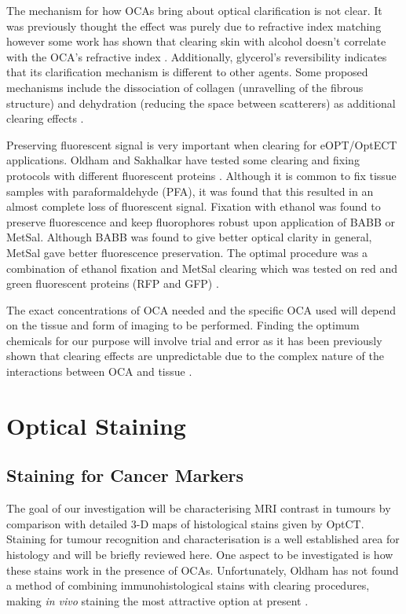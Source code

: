 \documentclass[12pt]{article}
\begin{document}
The mechanism for how OCAs bring about optical clarification is not clear. It was previously thought the effect was purely due to refractive index matching however some work has shown that clearing skin with alcohol doesn't correlate with the OCA's refractive index \cite{Choi:2005, Mao:2008}. Additionally, glycerol's reversibility indicates that its clarification mechanism is different to other agents. Some  proposed mechanisms include the dissociation of collagen (unravelling of the fibrous structure) and  dehydration (reducing the space between scatterers) as additional clearing effects \cite{Yeh:2003, Wen:2009is}.




Preserving fluorescent signal is very important when clearing for eOPT/OptECT applications. Oldham and Sakhalkar have tested some clearing and fixing protocols with different fluorescent proteins \cite{Sakhalkar:2007hp, Oldham:2008dfa}. Although it is common to fix tissue samples with paraformaldehyde (PFA), it was found that this resulted in an almost complete loss of fluorescent signal. Fixation with ethanol was found to preserve fluorescence and keep fluorophores robust upon application of BABB or MetSal. Although BABB was found to give better optical clarity in general, MetSal gave better fluorescence preservation. The optimal procedure was a combination of ethanol fixation and MetSal clearing which was tested on red and green fluorescent proteins (RFP and GFP) \cite{Sakhalkar:2007hp}.


The exact concentrations of OCA needed and the specific OCA used will depend on the tissue and form of imaging to be performed. Finding the optimum chemicals for our purpose will involve trial and error as it has been previously shown that clearing effects are unpredictable due to the complex nature of the interactions between OCA and tissue \cite{Wen:2009is}.



\section{Optical Staining}
\subsection{Staining for Cancer Markers}

The goal of our investigation will be characterising MRI contrast in tumours by comparison with detailed 3-D maps of histological stains given by OptCT. Staining for tumour recognition and characterisation is a well established area for histology and will be briefly reviewed here.  One aspect to be investigated is how these stains work in the presence of OCAs. Unfortunately, Oldham has not found a method of combining immunohistological stains with clearing procedures, making \textit{in vivo} staining the most attractive option at present \cite{Oldham:2008dfa}.
\end{document}
